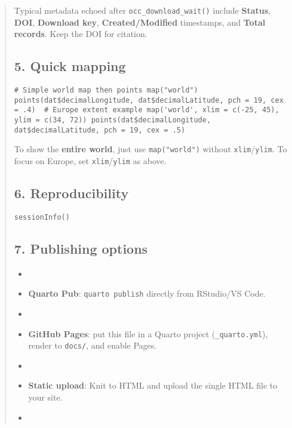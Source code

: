 \documentclass[
  letterpaper,
  DIV=11,
  numbers=noendperiod]{scrartcl}
\begin{document}
\begin{tcolorbox}
\begin{quote}
Typical metadata echoed after \texttt{occ\_download\_wait()} include
\textbf{Status}, \textbf{DOI}, \textbf{Download key},
\textbf{Created/Modified} timestamps, and \textbf{Total records}. Keep
the DOI for citation.\\

\subsection{5. Quick mapping}\label{quick-mapping}

\begin{verbatim}
# Simple world map then points map("world") points(dat$decimalLongitude, dat$decimalLatitude, pch = 19, cex = .4)  # Europe extent example map('world', xlim = c(-25, 45), ylim = c(34, 72)) points(dat$decimalLongitude, dat$decimalLatitude, pch = 19, cex = .5) 
\end{verbatim}

To show the \textbf{entire world}, just use \texttt{map("world")}
without \texttt{xlim}/\texttt{ylim}. To focus on Europe, set
\texttt{xlim}/\texttt{ylim} as above.\\

\subsection{6. Reproducibility}\label{reproducibility}

\begin{verbatim}
sessionInfo() 
\end{verbatim}

\subsection{7. Publishing options}\label{publishing-options}

\begin{itemize}
\item
\item
  \textbf{Quarto Pub}: \texttt{quarto\ publish} directly from RStudio/VS
  Code.
\item
\item
  \textbf{GitHub Pages}: put this file in a Quarto project
  (\texttt{\_quarto.yml}), render to \texttt{docs/}, and enable Pages.
\item
\item
  \textbf{Static upload}: Knit to HTML and upload the single HTML file
  to your site.
\item
\end{itemize}


\end{quote}
\end{tcolorbox}
\end{document}
